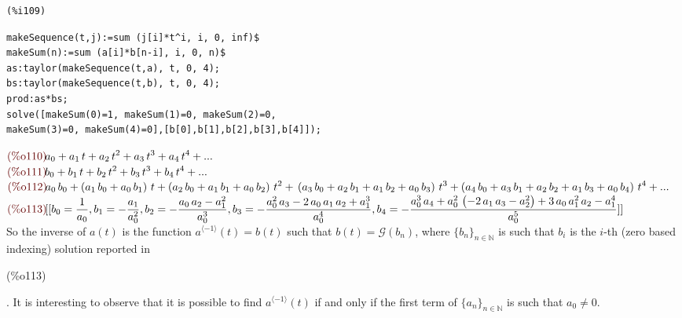 \noindent
\begin{minipage}[t]{8ex}{\color{red}\bf
\begin{verbatim}
(%i109) 
\end{verbatim}}
\end{minipage}
\begin{minipage}[t]{\textwidth}{\color{blue}
\begin{verbatim}
makeSequence(t,j):=sum (j[i]*t^i, i, 0, inf)$
makeSum(n):=sum (a[i]*b[n-i], i, 0, n)$
as:taylor(makeSequence(t,a), t, 0, 4);
bs:taylor(makeSequence(t,b), t, 0, 4);
prod:as*bs;
solve([makeSum(0)=1, makeSum(1)=0, makeSum(2)=0,
makeSum(3)=0, makeSum(4)=0],[b[0],b[1],b[2],b[3],b[4]]);
\end{verbatim}}
\end{minipage}
\begin{math}\displaystyle
\parbox{8ex}{\color{labelcolor}(\%o110) }
{a}_{0}+{a}_{1}\,t+{a}_{2}\,{t}^{2}+{a}_{3}\,{t}^{3}+{a}_{4}\,{t}^{4}+...
\end{math}\\
\begin{math}\displaystyle
\parbox{8ex}{\color{labelcolor}(\%o111) }
{b}_{0}+{b}_{1}\,t+{b}_{2}\,{t}^{2}+{b}_{3}\,{t}^{3}+{b}_{4}\,{t}^{4}+...
\end{math}\\
\begin{math}\displaystyle
\parbox{8ex}{\color{labelcolor}(\%o112) }
{a}_{0}\,{b}_{0}+\left( {a}_{1}\,{b}_{0}+{a}_{0}\,{b}_{1}\right)
\,t+\left( {a}_{2}\,{b}_{0}+{a}_{1}\,{b}_{1}+{a}_{0}\,{b}_{2}\right)
\,{t}^{2}+\\
\left( {a}_{3}\,{b}_{0}+{a}_{2}\,{b}_{1}+{a}_{1}\,{b}_{2}+{a}_{0}\,{b}_{3}\right) \,{t}^{3}+\left( {a}_{4}\,{b}_{0}+{a}_{3}\,{b}_{1}+{a}_{2}\,{b}_{2}+{a}_{1}\,{b}_{3}+{a}_{0}\,{b}_{4}\right) \,{t}^{4}+...
\end{math}\\
\begin{math}\displaystyle
  \parbox{8ex}{\color{labelcolor}(\%o113) }
  [[{b}_{0}=\frac{1}{{a}_{0}},{b}_{1}=-\frac{{a}_{1}}{{a}_{0}^{2}},{b}_{2}=-\frac{{a}_{0}\,{a}_{2}-{a}_{1}^{2}}{{a}_{0}^{3}},{b}_{3}=-\frac{{a}_{0}^{2}\,{a}_{3}-2\,{a}_{0}\,{a}_{1}\,{a}_{2}+{a}_{1}^{3}}{{a}_{0}^{4}},\\
  {b}_{4}=-\frac{{a}_{0}^{3}\,{a}_{4}+{a}_{0}^{2}\,\left(
      -2\,{a}_{1}\,{a}_{3}-{a}_{2}^{2}\right)
    +3\,{a}_{0}\,{a}_{1}^{2}\,{a}_{2}-{a}_{1}^{4}}{{a}_{0}^{5}}]]
\end{math}\\
So the inverse of $a(t)$ is the function $a^{\langle -1\rangle}(t)=
b(t)$ such that $b(t)= \mathcal{G} (b_n )$, where
$\{b_n\}_{n\in\mathbb{N} } $ is such that $b_i$ is the $i$-th (zero
based indexing) solution reported
in \parbox{8ex}{\color{labelcolor}(\%o113) }. It is interesting to
observe that it is possible to find $a^{\langle -1\rangle}(t)$ if and
only if the first term of $\{a_n\}_{n\in\mathbb{N} } $ is such that
$a_0 \not = 0$.

